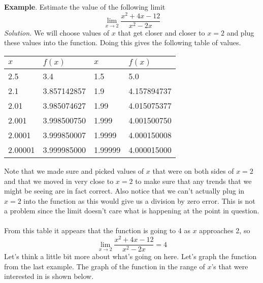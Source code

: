 \documentclass[10pt,reqno]{book}
\begin{document}
	\noindent \textbf{Example}. Estimate the value of the following limit
	\[ \lim\limits_{x\to 2} \frac{x^2 + 4x -12}{x^2-2x} \]
	\textit{Solution.} We will choose values of $ x $ that get closer and closer to $ x=2 $ and plug these values into the function. Doing this gives the following table of values.
	\begin{center}
		\begin{tabular}{ll|ll}
			$ x $   & $ f(x) $    & $ x $   & $ f(x) $    \\ \hline
			2.5     & 3.4         & 1.5     & 5.0         \\
			2.1     & 3.857142857 & 1.9     & 4.157894737 \\
			2.01    & 3.985074627 & 1.99    & 4.015075377 \\
			2.001   & 3.998500750 & 1.999   & 4.001500750 \\
			2.0001  & 3.999850007 & 1.9999  & 4.000150008 \\
			2.00001 & 3.999985000 & 1.99999 & 4.000015000
		\end{tabular}
	\end{center}
	Note that we made sure and picked values of $ x $ that were on both sides of $ x=2 $ and that we moved in very close to $ x=2 $ to make sure that any trends that we might be seeing are in fact correct. Also notice that we can't actually plug in $ x=2 $ into the function as this would give us a division by zero error. This is not a problem since the limit doesn't care what is happening at the point in question.\\ \\
	From this table it appears that the function is going to 4 as $ x $ approaches 2, so
	\[ \lim\limits_{x\to 2} \frac{x^2 + 4x -12}{x^2-2x} = 4  \]
	Let's think a little bit more about what’s going on here. Let's graph the function from the last example. The graph of the function in the range of $ x $'s that were interested in is shown below.
\end{document}
